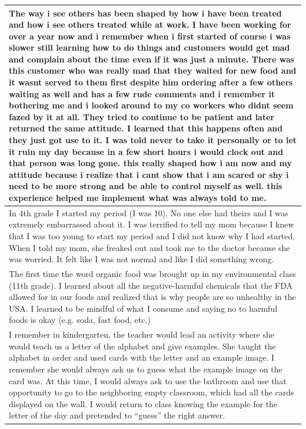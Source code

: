 \documentclass[
  .7em,
  letterpaper,
  DIV=11,
  numbers=noendperiod]{scrartcl}
\begin{document}
\begin{table}
\begin{tabular}{l}
The way i see others has been shaped by how i have been treated and how i see others treated while at work. I have been working for over a year now and i remember when i first started of course i was slower still learning how to do things and customers would get mad and complain about the time even if it was just a minute. There was this customer who was really mad that they waited for new food and it wasnt served to them first despite him ordering after a few others waiting as well and has a few rude comments and i remember it bothering me and i looked around to my co workers who didnt seem fazed by it at all. They tried to continue to be patient and later returned the same attitude. I learned that this happens often and they just got use to it. I was told never to take it personally or to let it ruin my day because in a few short hours i would clock out and that person was long gone. this really shaped how i am now and my attitude because i realize that i cant show that i am scared or shy i need to be more strong and be able to control myself as well. this experience helped me implement what was always told to me.\\
\hline
In 4th grade I started my period (I was 10). No one else had theirs and I was extremely embarrassed about it. I was terrified to tell my mom because I knew that I was too young to start my period and I did not know why I had started. When I told my mom, she freaked out and took me to the doctor because she was worried. It felt like I was not normal and like I did something wrong.\\
\hline
The first time the word organic food was brought up in my environmental class (11th grade). I learned about all the negative-harmful chemicals that the FDA allowed for in our foods and realized that is why people are so unhealthy in the USA. I learned to be mindful of what I consume and saying no to harmful foods is okay (e.g. soda, fast food, etc.)\\
\hline
I remember in kindergarten, the teacher would lead an activity where she would teach us a letter of the alphabet and give examples. She taught the alphabet in order and used cards with the letter and an example image. I remember she would always ask us to guess what the example image on the card was. At this time, I would always ask to use the bathroom and use that opportunity to go to the neighboring empty classroom, which had all the cards displayed on the wall. I would return to class knowing the example for the letter of the day and pretended to “guess” the right answer.\\

\end{tabular}
\end{table}
\end{document}
